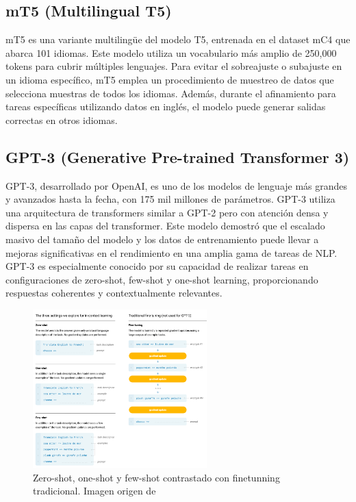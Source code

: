 \subsection{mT5 (Multilingual T5)}
mT5 es una variante multilingüe del modelo T5, entrenada en el dataset mC4 que abarca 101 idiomas. Este modelo utiliza un vocabulario más amplio de 250,000 tokens para cubrir múltiples lenguajes. Para evitar el sobreajuste o subajuste en un idioma específico, mT5 emplea un procedimiento de muestreo de datos que selecciona muestras de todos los idiomas. Además, durante el afinamiento para tareas específicas utilizando datos en inglés, el modelo puede generar salidas correctas en otros idiomas.

\subsection{GPT-3 (Generative Pre-trained Transformer 3)}
GPT-3, desarrollado por OpenAI, es uno de los modelos de lenguaje más grandes y avanzados hasta la fecha, con 175 mil millones de parámetros. GPT-3 utiliza una arquitectura de transformers similar a GPT-2 pero con atención densa y dispersa en las capas del transformer. Este modelo demostró que el escalado masivo del tamaño del modelo y los datos de entrenamiento puede llevar a mejoras significativas en el rendimiento en una amplia gama de tareas de NLP. GPT-3 es especialmente conocido por su capacidad de realizar tareas en configuraciones de zero-shot, few-shot y one-shot learning, proporcionando respuestas coherentes y contextualmente relevantes. \hfill \break

\begin{figure}[h]
\centering
\includegraphics[width=0.6\textwidth]{figuras/capitulo1/gpt3.png}
\caption{Zero-shot, one-shot y few-shot contrastado con finetunning tradicional. Imagen origen de \citep{brown2020language}}
\label{fig:llm_evolution}
\end{figure}


